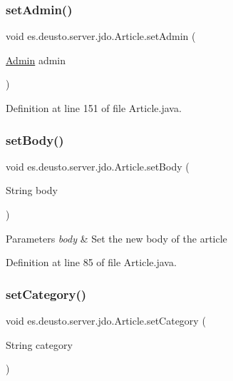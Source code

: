 \subsubsection{\texorpdfstring{set\+Admin()}{setAdmin()}}
{\footnotesize\ttfamily void es.\+deusto.\+server.\+jdo.\+Article.\+set\+Admin (\begin{DoxyParamCaption}\item[{\hyperlink{classes_1_1deusto_1_1server_1_1jdo_1_1_admin}{Admin}}]{admin }\end{DoxyParamCaption})}



Definition at line 151 of file Article.\+java.

\mbox{\label{classes_1_1deusto_1_1server_1_1jdo_1_1_article_a5160202c2a15e13a3acb376be95af99c}} 
\subsubsection{\texorpdfstring{set\+Body()}{setBody()}}
{\footnotesize\ttfamily void es.\+deusto.\+server.\+jdo.\+Article.\+set\+Body (\begin{DoxyParamCaption}\item[{String}]{body }\end{DoxyParamCaption})}


\begin{DoxyParams}{Parameters}
{\em body} & Set the new body of the article \\
\hline
\end{DoxyParams}


Definition at line 85 of file Article.\+java.

\mbox{\label{classes_1_1deusto_1_1server_1_1jdo_1_1_article_aff563311f5d736b7e3e9394072957c2c}} 
\subsubsection{\texorpdfstring{set\+Category()}{setCategory()}}
{\footnotesize\ttfamily void es.\+deusto.\+server.\+jdo.\+Article.\+set\+Category (\begin{DoxyParamCaption}\item[{String}]{category }\end{DoxyParamCaption})}


